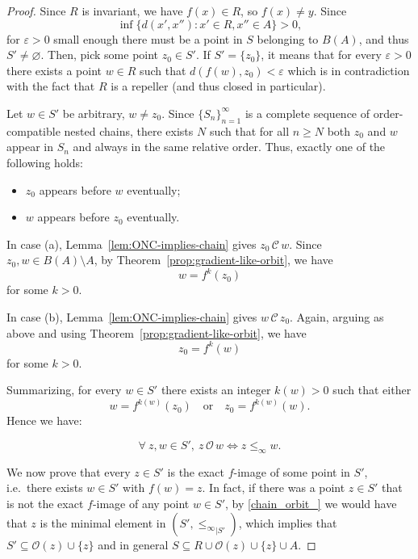 \documentclass[10pt,a4paper]{amsart}
\begin{document}
\begin{proof}
Since $R$ is invariant, we have $f(x)\in R$, so $f(x)\neq y$. Since $$\inf \{d(x',x''):x'\in R, x''\in A\}>0,$$ for $\varepsilon>0$ small enough there must be a point in $S$ belonging to $B(A)$, and thus $S'\neq\varnothing$. Then, pick some point $z_0\in S'$. If $S'=\{z_0\}$, it means that for every $\varepsilon>0$ there exists a point $w\in R$ such that $d(f(w),z_0)<\varepsilon$ which is in  contradiction with the fact that $R$ is a repeller (and thus closed in particular).

Let $w\in S'$ be arbitrary, $w\neq z_0$. Since $\{S_n\}_{n=1}^{\infty}$ is
a complete sequence of order-compatible nested chains, there exists $N$ such that for all $n\ge N$ both
$z_0$ and $w$ appear in $S_n$ and always in the same relative order.
Thus, exactly one of the following holds:

\begin{itemize}
    \item[(a)] $z_0$ appears before $w$ eventually;
    \item[(b)] $w$ appears before $z_0$ eventually.
\end{itemize}

In case (a), Lemma~\ref{lem:ONC-implies-chain} gives
$z_0\,\mathcal{C}\,w$. Since $z_0,w\in B(A)\setminus A$, by Theorem~\ref{prop:gradient-like-orbit}, we have
$$w = f^{k}(z_0)$$
for some $k>0$.

In case (b), Lemma~\ref{lem:ONC-implies-chain} gives $w\,\mathcal{C}\,z_0$.
Again, arguing as above and using Theorem~\ref{prop:gradient-like-orbit}, we have
$$z_0 = f^{k}(w)$$
for some $k> 0$.

Summarizing, for every $w\in S'$ there exists an integer
$k(w)> 0$ such that either
$$
   w = f^{k(w)}(z_0)
   \quad\text{or}\quad
   z_0 = f^{k(w)}(w).
$$
Hence we have: 

\begin{equation}\label{chain_orbit_}
\forall\  z,w\in S', \ z\,\mathcal{O}\,w \iff z\le_\infty w.
\end{equation}

We now prove that every $z\in S'$ is the exact $f$-image of some point in $S'$, i.e.\ there exists $w\in S'$ with $f(w)=z$. In fact, if there was a point $z\in S'$ that is not the exact $f$-image of any point $w\in S'$, by \eqref{chain_orbit_} we would have that $z$ is the minimal element in $(S',{\le_\infty}_{|S'})$, which implies that $S'\subseteq\mathcal{O}(z)\cup\{z\}$ and in general $S\subseteq R\cup\mathcal{O}(z)\cup\{z\}\cup A$.


\end{proof}
\end{document}
